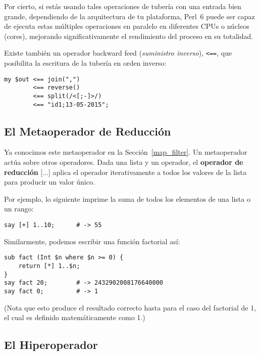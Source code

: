 Por cierto, si estás usando tales operaciones de tubería con una
entrada bien grande, dependiendo de la arquitectura de tu plataforma, 
Perl~6 puede ser capaz de ejecuta estas múltiples operaciones en paralelo
en diferentes CPUs o núcleos (cores), mejorando significativamente
el rendimiento del proceso en su totalidad.

Existe también un operador backward feed (\emph{suministro inverso}), \verb|<==|,
que posibilita la escritura de la tubería en orden inverso:
\ifplastex \else
{}
\fi

\begin{verbatim}
my $out <== join(",") 
        <== reverse() 
        <== split(/<[;-]>/) 
        <== "id1;13-05-2015";
\end{verbatim}


\subsection{El Metaoperador de Reducción}

Ya conocimos este metaoperador en la Sección~\ref{map_filter}. Un metaoperador
actúa sobre otros operadores. Dada una lista y un operador, el {\bf operador de reducción}
[...] aplica el operador iterativamente a todos los valores de la lista
para producir un valor único.

Por ejemplo, lo siguiente imprime la suma de todos los elementos
de una lista o un rango:

\begin{verbatim}
say [+] 1..10;      # -> 55
\end{verbatim}

Similarmente, podemos escribir una función factorial así:

\begin{verbatim}
sub fact (Int $n where $n >= 0) {
    return [*] 1..$n;
}
say fact 20;        # -> 2432902008176640000
say fact 0;         # -> 1
\end{verbatim}

(Nota que esto produce el resultado correcto hasta para el caso 
del factorial de 1, el cual es definido matemáticamente como 1.)

\subsection{El Hiperoperador}


